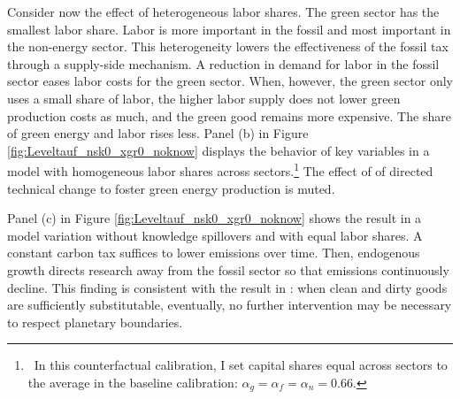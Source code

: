 Consider now the effect of heterogeneous labor shares. The green sector has the smallest labor share. Labor is more important in the fossil and most important in the non-energy sector. This heterogeneity lowers the effectiveness of the fossil tax through a supply-side mechanism. 
 A reduction in demand for labor in the fossil sector eases labor costs for the green sector. When, however, the green sector only uses a small share of labor, the higher labor supply does not lower green production costs as much, and the green good remains more expensive. The share of green energy and labor rises less. Panel (b) in Figure \ref{fig:Leveltauf_nsk0_xgr0_noknow} displays the behavior of key variables in a model with homogeneous labor shares across sectors.\footnote{\ In this counterfactual calibration, I set capital shares equal across sectors to the average in the baseline calibration: $\alpha_g=\alpha_f=\alpha_n=0.66$. } The effect of of directed technical change to foster green energy production is muted. 






Panel (c) in Figure \ref{fig:Leveltauf_nsk0_xgr0_noknow} shows the result in a model variation without knowledge spillovers and with equal labor shares. A constant carbon tax suffices to lower emissions over time. Then, endogenous growth directs research away from the fossil sector so that emissions continuously decline.  This finding is consistent with the result in \cite{Acemoglu2012TheChange}:  when clean and dirty goods are sufficiently substitutable, eventually, no further intervention may be necessary to respect planetary boundaries.


